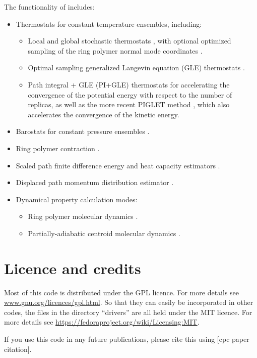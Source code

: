 \documentclass[11pt,english,fleqn]{report}
\begin{document}
The functionality of \ipi includes:
\begin{itemize}
\item Thermostats for constant temperature ensembles, including: \begin{itemize}
\item Local and global stochastic thermostats \cite{plangevin1908cras,buss-parr08cpc}, with optional optimized sampling of the ring polymer normal mode coordinates \cite{ceri+10jcp}.
\item Optimal sampling generalized Langevin equation (GLE) thermostats \cite{ceri+09jctc}.
\item Path integral + GLE (PI+GLE) thermostats \cite{ceri+11jcp} for accelerating the
convergence of the potential energy with respect to the number of replicas, 
as well as the more recent PIGLET method \cite{ceri-mano12prl}, which also
accelerates the convergence of the kinetic energy.
\end{itemize}
\item Barostats for constant pressure ensembles \cite{mart+99jcp,buss+09jpc}.
\item Ring polymer contraction \cite{mark-mano08jcp}.
\item Scaled path finite difference energy and heat capacity estimators
\cite{tyamamoto05jcp}.
\item Displaced path momentum distribution estimator \cite{linlin+10prl}.
\item Dynamical property calculation modes:\begin{itemize}
\item Ring polymer molecular dynamics \cite{crai-mano04jcp}.
\item Partially-adiabatic centroid molecular dynamics \cite{habe+08jcp,hone+06jcp}.
\end{itemize}
\end{itemize}

\section{Licence and credits}

Most of this code is distributed under the GPL licence. For more details see
\url{www.gnu.org/licences/gpl.html}. 
So that they can easily be incorporated in other codes, the files
in the directory {}``drivers'' are all held under the MIT licence.
For more details see \url{https://fedoraproject.org/wiki/Licensing:MIT}.

If you use this code in any
future publications, please cite this using {[}cpc paper citation{]}.
\end{document}
